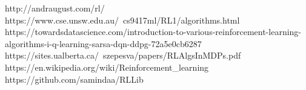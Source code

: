 \documentclass[12pt]{article}
\begin{document}
\newpage




\begin{thebibliography}{00}
http://andraugust.com/rl/
\bibitem{}https://www.cse.unsw.edu.au/~cs9417ml/RL1/algorithms.html
\bibitem{}https://towardsdatascience.com/introduction-to-various-reinforcement-learning-algorithms-i-q-learning-sarsa-dqn-ddpg-72a5e0cb6287
\bibitem{}https://sites.ualberta.ca/~szepesva/papers/RLAlgsInMDPs.pdf
https://en.wikipedia.org/wiki/Reinforcement\_learning
https://github.com/samindaa/RLLib
\end{thebibliography}
\end{document}
